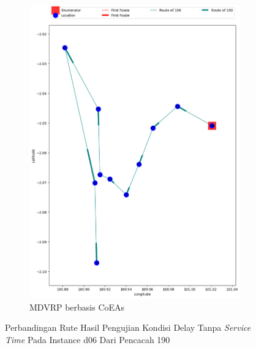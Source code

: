 \begin{figure}[H]
	\centering
	\begin{subfigure}[t]{\textwidth}
		\centering
		\includegraphics[width=\textwidth]{Resources/Images/delayed_6/real_m15_n100_delayed_6_190_coes}
		\caption{MDVRP berbasis CoEAs}
		\label{fig:real_m15_n100_delayed_6_190_coes}
	\end{subfigure}
	\caption{Perbandingan Rute Hasil Pengujian Kondisi Delay Tanpa \textit{Service Time} Pada Instance d06 Dari Pencacah 190}
	\label{fig:real_m15_n100_delayed_6_190}
\end{figure}


